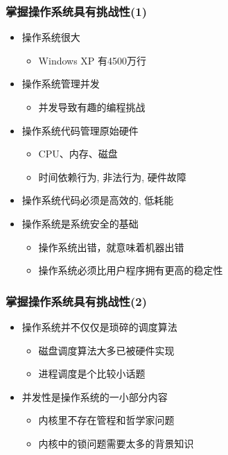 \begin{frame}
    \frametitle{掌握操作系统具有挑战性(1)}
    \begin{itemize}
        \item 操作系统很大
            \begin{itemize}
                \item Windows XP 有4500万行
            \end{itemize} \pause
        \item 操作系统管理并发
            \begin{itemize}
                \item 并发导致有趣的编程挑战
            \end{itemize} \pause
        \item 操作系统代码管理原始硬件
            \begin{itemize}
               \item CPU、内存、磁盘
                \item 时间依赖行为, 非法行为, 硬件故障
            \end{itemize} \pause
        \item 操作系统代码必须是高效的, 低耗能 \pause
        \item 操作系统是系统安全的基础
            \begin{itemize}
                \item 操作系统出错，就意味着机器出错
                \item 操作系统必须比用户程序拥有更高的稳定性
            \end{itemize}
        
    \end{itemize}
\end{frame}

    
\begin{frame}
    \frametitle{掌握操作系统具有挑战性(2)}
    \begin{itemize}
        \item 操作系统并不仅仅是琐碎的调度算法
            \begin{itemize}
                \item 磁盘调度算法大多已被硬件实现
                \item 进程调度是个比较小话题
            \end{itemize}
        \item 并发性是操作系统的一小部分内容
            \begin{itemize}
                \item 内核里不存在管程和哲学家问题
                \item 内核中的锁问题需要太多的背景知识
            \end{itemize}

    \end{itemize}
\end{frame}

